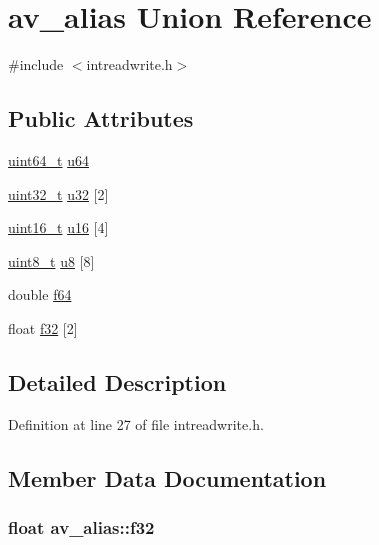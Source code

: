 \hypertarget{unionav__alias}{}\section{av\+\_\+alias Union Reference}
\label{unionav__alias}


{\ttfamily \#include $<$intreadwrite.\+h$>$}

\subsection*{Public Attributes}
\begin{DoxyCompactItemize}
\item 
\hyperlink{lib-src_2ffmpeg_2win32_2stdint_8h_aec6fcb673ff035718c238c8c9d544c47}{uint64\+\_\+t} \hyperlink{unionav__alias_a6a73a59728e1b8d7d06123f5af4d59f7}{u64}
\item 
\hyperlink{lib-src_2ffmpeg_2win32_2stdint_8h_a6eb1e68cc391dd753bc8ce896dbb8315}{uint32\+\_\+t} \hyperlink{unionav__alias_a98d19f5ed2320978bb0a25d387601b7d}{u32} \mbox{[}2\mbox{]}
\item 
\hyperlink{lib-src_2ffmpeg_2win32_2stdint_8h_a30af71eaf40c925c9832eb289a48da35}{uint16\+\_\+t} \hyperlink{unionav__alias_a79c01861a51e254641c99be17f8aa4f0}{u16} \mbox{[}4\mbox{]}
\item 
\hyperlink{lib-src_2ffmpeg_2win32_2stdint_8h_a9a941819355e6f658991890ff66b4b0e}{uint8\+\_\+t} \hyperlink{unionav__alias_a7f6d1b60592207433aabf0f688f93b1d}{u8} \mbox{[}8\mbox{]}
\item 
double \hyperlink{unionav__alias_ad0906d74a615b1c9add8022e88d0a8ea}{f64}
\item 
float \hyperlink{unionav__alias_ababb756537b6e9fff284ee6eecbb90de}{f32} \mbox{[}2\mbox{]}
\end{DoxyCompactItemize}


\subsection{Detailed Description}


Definition at line 27 of file intreadwrite.\+h.



\subsection{Member Data Documentation}
\subsubsection[{\texorpdfstring{f32}{f32}}]{\setlength{\rightskip}{0pt plus 5cm}float av\+\_\+alias\+::f32}\hypertarget{unionav__alias_ababb756537b6e9fff284ee6eecbb90de}{}\label{unionav__alias_ababb756537b6e9fff284ee6eecbb90de}


